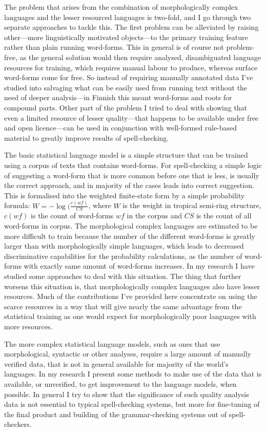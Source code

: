 \documentclass[officiallayout,draft]{unihelcompling}
\begin{document}
The problem that arises from the combination of morphologically complex 
languages and the lesser resourced languages is two-fold, and I go through two
separate approaches to tackle this. The first problem can be alleviated by
raising other---more linguistically motivated objects---to the primary training
feature rather than plain running word-forms. This in general is of course not
problem-free, as the general solution would then require analysed, 
disambiguated language resources for training, which requires manual labour to
produce, whereas surface word-forms come for free. So instead of requiring
manually annotated data I've studied into salvaging what can be easily used
from running text without the need of deeper analysis---in Finnish this meant
word-forms and roots for compound parts. Other part of the problem I tried to
deal with showing that even a limited resource of lesser quality---that
happens to be available under free and open licence---can be used
in conjunction with well-formed rule-based material to greatly improve results
of spell-checking.

The basic statistical language model is a simple structure that can be trained
using a corpus of texts that contains word-forms. For spell-checking a simple
logic of suggesting a word-form that is more common before one that is less, is
usually the correct approach, and in majority of the cases leads into correct
suggestion. This is formalised into the weighted finite-state form by a simple
probability formula: $W = -\log(\frac{c(wf)}{CS}$, where $W$ is the weight in
tropical semi-ring structure, $c(wf)$ is the count of word-forms  $wf$ in the
corpus and $CS$ is the count of all word-forms in corpus. The morphological
complex languages are estimated to be more difficult to train because the
number of the different word-forms is greatly larger than with morphologically
simple languages, which leads to decreased discriminative capabilities for
the probability calculations, as the number of word-forms with exactly same
amount of word-forms increases. In my research I have studied some approaches
to deal with this situation. The thing that further worsens this situation is,
that morphologically complex languages also have lesser resources. Much of the
contributions I've provided here concentrate on using the scarce resources in
a way that will give nearly the same advantage from the statistical training
as one would expect for morphologically poor languages with more resources.

The more complex statistical language models, such as ones that use
morphological, syntactic or other analyses, require a large amount of
manually verified data, that is not in general available for majority of the
world's languages. In my research I present some methods to make use of the
data that is available, or unverified, to get improvement to the language
models, when possible. In general I try to show that the significance of such
quality analysis data is not essential to typical spell-checking systems, but
more for fine-tuning of the final product and building of the grammar-checking
systems out of spell-checkers.
\end{document}
